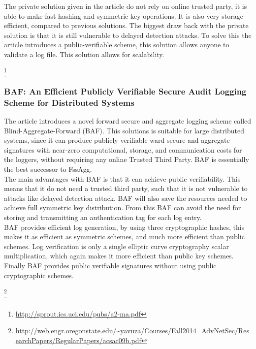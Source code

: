 The private solution given in the article do not rely on online trusted party, it is able to make fast hashing and symmetric key operations. It is also very storage-efficient, compared to previous solutions. The biggest draw back with the private solution is that it is still vulnerable to delayed detection attacks. To solve this the article introduces a public-verifiable scheme, this solution allows anyone to validate a log file. This solution allows for scalability. 

\footnote{\url{http://sprout.ics.uci.edu/pubs/a2-ma.pdf}}
\subsubsection{BAF: An Efficient Publicly Verifiable Secure Audit Logging Scheme for Distributed Systems}
The article introduces a novel forward secure and aggregate logging scheme called Blind-Aggregate-Forward (BAF). This solutions is suitable for large distributed systems, since it can produce publicly verifiable ward secure and aggregate signatures with near-zero computational, storage, and communication costs for the loggers, without requiring any online Trusted Third Party.  BAF is essentially the best successor to FssAgg. \\
The main advantages with BAF is that it can achieve public verifiability. This means that it do not need a trusted third party, such that it is not vulnerable to attacks like delayed detection attack. BAF will also save the resources needed to achieve full symmetric key distribution. From this BAF can avoid the need for storing and transmitting an authentication tag for each log entry.  \\
BAF provides efficient log generation, by using three cryptographic hashes, this makes it as efficient as symmetric schemes, and much more efficient than public schemes. Log verification is only a single elliptic curve cryptography scalar multiplication, which again makes it more efficient than public key schemes. Finally BAF provides public verifiable signatures without using public cryptographic schemes. 

\footnote{\raggedright \url{http://web.engr.oregonstate.edu/~yavuza/Courses/Fall2014_AdvNetSec/ResearchPapers/RegularPapers/acsac09b.pdf}}

